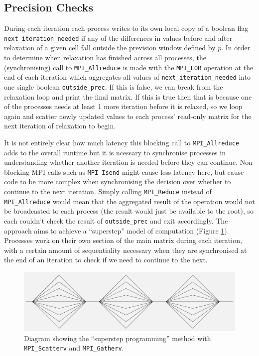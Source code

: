 \documentclass[11pt]{article}
\begin{document}
{\color{darkindigo}
\subsection*{Precision Checks}}
During each iteration each process writes to its own local copy of a boolean flag \texttt{next\_iteration\_needed} if any of the differences in values before and after relaxation of a given cell fall outside the prevision window defined by $p$. In order to determine when relaxation has finished across all processes, the (synchronising) call to \texttt{MPI\_Allreduce} is made with the \texttt{MPI\_LOR} operation at the end of each iteration which aggregates all values of \texttt{next\_iteration\_needed} into one single boolean \texttt{outside\_prec}. If this is false, we can break from the relaxation loop and print the final matrix. If this is true then that is because one of the processes needs at least 1 more iteration before it is relaxed, so we loop again and scatter newly updated values to each process' read-only matrix for the next iteration of relaxation to begin.

It is not entirely clear how much latency this blocking call to \texttt{MPI\_Allreduce} adds to the overall runtime but it is ncessary to synchronise processes in understanding whether another iteration is needed before they can continue. Non-blocking MPI calls such as \texttt{MPI\_Isend} might cause less latency here, but cause code to be more complex when synchronising the decision over whether to continue to the next iteration.  Simply calling \texttt{MPI\_Reduce} instead of \texttt{MPI\_Allreduce} would mean that the aggregated result of the operation would not be broadcasted to each process (the result would just be available to the root), so each couldn't check the result of \texttt{outside\_prec} and exit accordingly. The approach aims to achieve a ``superstep'' model of computation (Figure \ref{fig:superstep}). Processes work on their own section of the main matrix during each iteration, with a certain amount of sequentiality necessary when they are synchronised at the end of an iteration to check if we need to continue to the next.

\begin{figure}[H]
\centering
\includegraphics[scale=0.2]{img/superstep.png} 
\caption{Diagram showing the ``superstep programming'' method with \texttt{MPI\_Scatterv} and \texttt{MPI\_Gatherv}.}\label{fig:superstep}
\end{figure}
\end{document}
